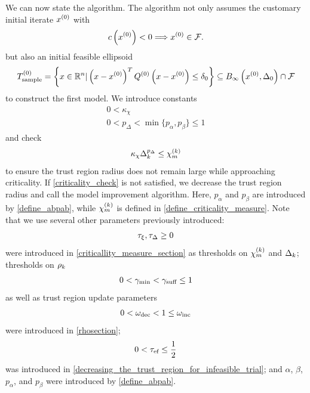 We can now state the algorithm.
The algorithm not only assumes the customary initial iterate $ {x^{(0)}} $ with 
\begin{align}
\label{initial_point_is_feasible}
c\left({x^{(0)}}\right) < 0 \Longrightarrow {x^{(0)}} \in {\mathcal F}.
\end{align}
but also an initial feasible ellipsoid
\begin{align}
\label{initial_ellipsoid}
T_{\text{sample}}^{(0)} = \left\{x \in\mathbb R^n | \left(x - {x^{(0)}}\right)^T Q^{(0)} \left(x - {x^{(0)}}\right) \le \delta_0 \right\} \subseteq B_{\infty}\left({x^{(0)}}, \Delta_{0}\right) \cap {\mathcal F} 
\end{align}
to construct the first model.
We introduce constants
\begin{align}
0 < \kappa_{\chi} \label{define_kappa_chi} \\
0 < p_{\Delta} < \min\{p_{\alpha}, p_{\beta}\} \le 1 \label{define_p_delta} 
\end{align}
and check
\begin{align}
\kappa_{\chi} \Delta_k^{p_{\Delta}} \le {\chi_m^{(k)}} \label{criticality_check}
\end{align}
to ensure the trust region radius does not remain large while approaching criticality.    If \cref{criticality_check} is not satisfied, we decrease the trust region radius and call the model improvement algorithm.
Here,
$p_{\alpha}$ and $p_{\beta}$ are introduced by \cref{define_abpab},
while ${\chi_m^{(k)}}$ is defined in \cref{define_criticality_measure}.
Note that we use several other parameters previously introduced:
\begin{align}
\tau_{\xi}, \tau_{\Delta} \ge 0 \label{define_algorithm_tolerances}
\end{align}
were introduced in \cref{criticallity_measure_section} as thresholds on ${\chi_m^{(k)}}$ and $\Delta_k$; %
thresholds on $\rho_k$
\begin{align}
0 < \gamma_{\textrm{min}} < \gamma_{\textrm{suff}} \le 1	\label{define_the_gammas}
\end{align}
as well as trust region update parameters
\begin{align}
0 < \omega_{\text{dec}} < 1 \le \omega_{\text{inc}} \label{define_the_omegas}
\end{align}
were introduced in \cref{rhosection};
\begin{align}
0 < {\tau_{\textrm{ef}}} \le \frac 1 2 \label{define_tolsr}
\end{align}
was introduced in \cref{decreasing_the_trust_region_for_infeasible_trial};
and $\alpha$, $\beta$, $p_{\alpha}$, and $p_{\beta}$ were introduced by \cref{define_abpab}.

